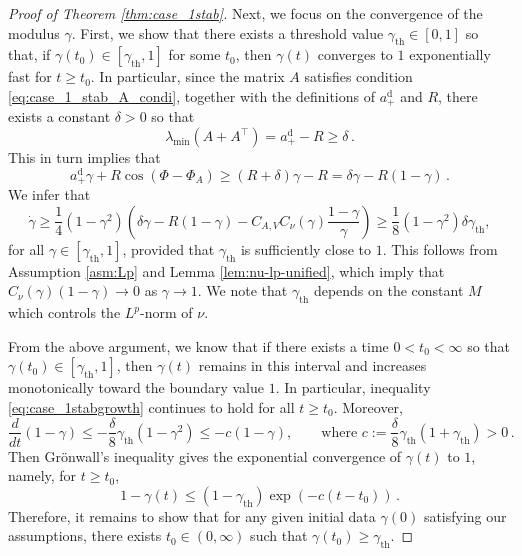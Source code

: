 \documentclass[10pt]{article}
\theoremstyle{definition}
\theoremstyle{definition}
\numberwithin{equation}{section}
\newcommand{\aDPlus}{a_+^{\text{d}}}
\newcommand{\gammaTH}{\gamma_{\mathrm{th}}}
\newcommand{\PhiA}{\Phi_{A}}
\begin{document}
\begin{proof}[Proof of Theorem \ref{thm:case_1stab}]
Next, we focus on the convergence of the modulus $\gamma$. 
First, we show that there exists a threshold value $\gammaTH \in [0,1]$ so that, if $\gamma(t_0) \in [\gammaTH, 1]$ for some $t_0$, then $\gamma(t)$ converges to $1$ exponentially fast for $t \geq t_0$.
In particular, since the matrix $A$ satisfies condition \eqref{eq:case_1_stab_A_condi}, together with the definitions of $\aDPlus$ and $R$, there exists a constant $\delta > 0$ so that 
\begin{equation*}
   \lambda_{\text{min}} \left(A + A^{\top} \right) = \aDPlus - R \geq \delta \, .
\end{equation*}
This in turn implies that
\begin{equation*}
\aDPlus \gamma + R \cos (\Phi - \PhiA) \geq (R + \delta) \gamma - R = \delta \gamma - R (1 - \gamma) \, .
\end{equation*}
We infer that
\begin{equation}\label{eq:case_1stabgrowth}
     \dot{\gamma}\geq \frac{1}{4}(1-\gamma^2)(\delta\gamma - R(1-\gamma) -C_{A,V} C_\nu(\gamma)\frac{1-\gamma}{\gamma})\geq \frac{1}{8}(1-\gamma^2)\delta \gammaTH,
\end{equation}
for all $\gamma \in [\gammaTH, 1]$, provided that $\gammaTH$ is sufficiently close to $1$.
This follows from Assumption \ref{asm:Lp} and Lemma \ref{lem:nu-lp-unified}, which imply that $C_\nu(\gamma)(1-\gamma) \rightarrow 0$ as $\gamma\to1$.
We note that $\gammaTH$ depends on the constant $M$ which controls the $L^p$-norm of $\nu$. 

From the above argument, we know that if there exists a time $0 < t_0 < \infty$ so that $\gamma(t_0) \in [\gammaTH, 1]$, then $\gamma(t)$ remains in this interval and increases monotonically toward the boundary value $1$.
In particular, inequality \eqref{eq:case_1stabgrowth} continues to hold for all $t \geq t_0$.
Moreover, 
\begin{equation*}
\frac{d}{dt} (1 - \gamma) \leq -\frac{\delta}{8} \gammaTH (1 - \gamma^2) \leq - c (1 - \gamma), \qquad \text{where } c := \frac{\delta}{8} \gammaTH (1 + \gammaTH) > 0 \, .
\end{equation*}
Then Grönwall's inequality gives the exponential convergence of $\gamma(t)$ to $1$, namely, for $t \geq t_0$,
\begin{equation}\label{eq:case1_stab_gamma_exp_conv}
    1 - \gamma(t) \leq (1 - \gammaTH) \exp \left( - c (t - t_0) \right) \, .
\end{equation}
Therefore, it remains to show that for any given initial data $\gamma(0)$ satisfying our assumptions, there exists $t_0 \in (0,\infty) $ such that $\gamma(t_0) \geq \gammaTH$.


\end{proof}
\end{document}
